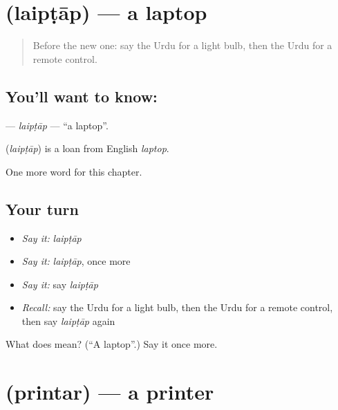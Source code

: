 \section[\texorpdfstring{\ur{لیپ} \ur{ٹاپ} (laipṭāp)}{لیپ ٹاپ (laipṭāp)}]{  (laipṭāp) — a laptop}

\label{lesson:UR-C165-laiptap}



\begin{quote}
Before the new one: say the Urdu for a light bulb, then the Urdu for a remote control.
\end{quote}

\subsection*{You'll want to know:  }
\textbf{ } — \emph{laipṭāp} — \textquotedblleft{}a laptop\textquotedblright{}.

\begin{cousinweb}
\textbf{ } (\emph{laipṭāp}) is a loan from English \emph{laptop}.
\end{cousinweb}

\begin{grammarlens}[title={What you've built}]
One more word for this chapter.
\end{grammarlens}

\subsection*{Your turn}
\begin{itemize}
\raggedright
  \item \emph{Say it:} \emph{laipṭāp}
  \item \emph{Say it:} \emph{laipṭāp}, once more
  \item \emph{Say it:} say \emph{laipṭāp}
  \item \emph{Recall:} say the Urdu for a light bulb, then the Urdu for a remote control, then say \emph{laipṭāp} again
\end{itemize}

\begin{tcolorbox}[breakable,colback=teal!4,colframe=teal!35!black,title={Before you move on}]
What does   mean? (\textquotedblleft{}A laptop\textquotedblright{}.) Say it once more.
\end{tcolorbox}
\section[\texorpdfstring{\ur{پرنٹر} (printar)}{پرنٹر (printar)}]{ (printar) — a printer}

